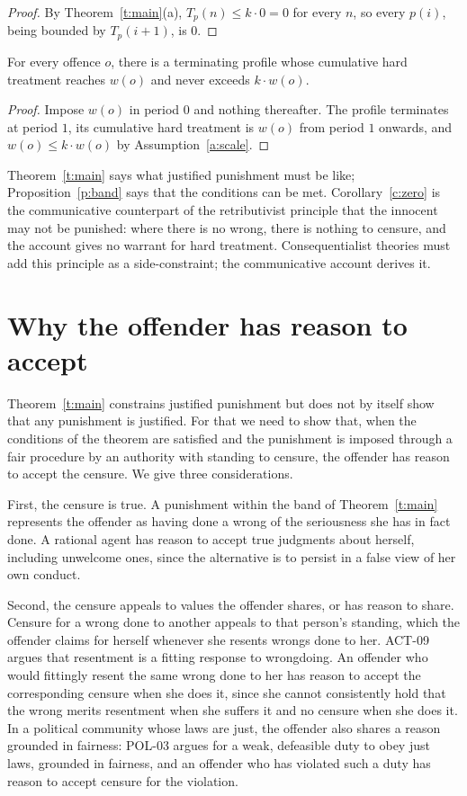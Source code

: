 \documentclass{situationist-preprint}
\begin{document}
\begin{proof}
By Theorem~\ref{t:main}(a), $T_p(n)\le k\cdot 0 = 0$ for every $n$, so every $p(i)$, being bounded by $T_p(i+1)$, is $0$.
\end{proof}

\begin{proposition}\label{p:band}
For every offence $o$, there is a terminating profile whose cumulative hard treatment reaches $w(o)$ and never exceeds $k\cdot w(o)$.
\end{proposition}

\begin{proof}
Impose $w(o)$ in period $0$ and nothing thereafter. The profile terminates at period $1$, its cumulative hard treatment is $w(o)$ from period $1$ onwards, and $w(o)\le k\cdot w(o)$ by Assumption~\ref{a:scale}.
\end{proof}

Theorem~\ref{t:main} says what justified punishment must be like; Proposition~\ref{p:band} says that the conditions can be met. Corollary~\ref{c:zero} is the communicative counterpart of the retributivist principle that the innocent may not be punished: where there is no wrong, there is nothing to censure, and the account gives no warrant for hard treatment. Consequentialist theories must add this principle as a side-constraint; the communicative account derives it.

\section{Why the offender has reason to accept}

Theorem~\ref{t:main} constrains justified punishment but does not by itself show that any punishment is justified. For that we need to show that, when the conditions of the theorem are satisfied and the punishment is imposed through a fair procedure by an authority with standing to censure, the offender has reason to accept the censure. We give three considerations.

First, the censure is true. A punishment within the band of Theorem~\ref{t:main} represents the offender as having done a wrong of the seriousness she has in fact done. A rational agent has reason to accept true judgments about herself, including unwelcome ones, since the alternative is to persist in a false view of her own conduct.

Second, the censure appeals to values the offender shares, or has reason to share. Censure for a wrong done to another appeals to that person's standing, which the offender claims for herself whenever she resents wrongs done to her. ACT-09 argues that resentment is a fitting response to wrongdoing. An offender who would fittingly resent the same wrong done to her has reason to accept the corresponding censure when she does it, since she cannot consistently hold that the wrong merits resentment when she suffers it and no censure when she does it. In a political community whose laws are just, the offender also shares a reason grounded in fairness: POL-03 argues for a weak, defeasible duty to obey just laws, grounded in fairness, and an offender who has violated such a duty has reason to accept censure for the violation.
\end{document}
